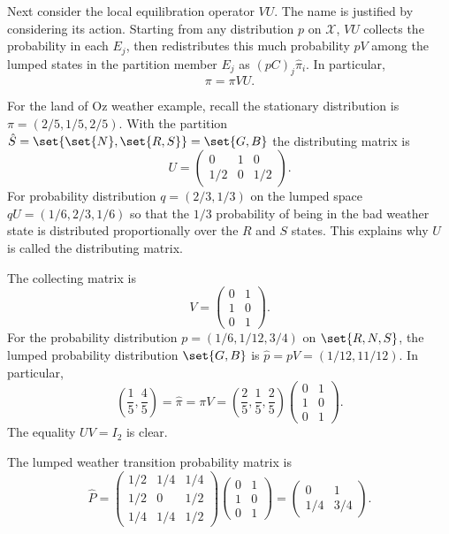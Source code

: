 \documentclass[12pt]{article}
\begin{document}
Next consider the local equilibration operator \( VU \).  The name is
justified by considering its action.  Starting from any distribution \(
p \) on \( \mathcal{X} \), \( VU \) collects the probability in each \(
E_j \), then redistributes this much probability \( pV \) among the
lumped states in the partition member \( E_j \) as \( (pC)_j
\hat{\pi}_i \).  In particular,
\[
    \pi = \pi VU.
\]

\begin{example}
    For the land of Oz weather example, recall the stationary
    distribution is \( \pi = (2/5, 1/5, 2/5) \).  With the partition
    \( \hat{S} = \set{ \set{N}, \set{R,S}} =\set{G, B} \)
    the distributing matrix is
    \[
        U =
        \begin{pmatrix}
            0 & 1 & 0 \\
            1/2 & 0 & 1/2
        \end{pmatrix}
        .
    \] For probability distribution \( q = (2/3, 1/3) \) on the lumped
    space \( qU = (1/6, 2/3, 1/6) \) so that the \( 1/3 \) probability
    of being in the bad weather state is distributed proportionally over
    the \( R \) and \( S \) states.  This explains why \( U \) is called
    the distributing matrix.

    The collecting matrix is
    \[
      V=\begin{pmatrix}
            0 & 1 \\
            1 & 0 \\
            0 & 1
        \end{pmatrix}
        .
      \]
    For the probability distribution \( p = (1/6, 1/12, 3/4) \) on \(
    \set{R,N,S} \), the lumped probability distribution \( \set{G, B}
    \) is \( \hat{p} = pV = (1/12, 11/12) \).  In particular,
    \[
      \left( \frac{1}{5}, \frac{4}{5} \right) = \hat{\pi} = \pi V =
      \left( \frac{2}{5}, \frac{1}{5}, \frac{2}{5} \right)
      \begin{pmatrix}
            0 & 1 \\
            1 & 0 \\
            0 & 1
        \end{pmatrix}
        . 
    \]
    The equality \( UV = I_2 \) is clear.
    
    The lumped weather transition probability matrix is
    \[
        \hat{P} =
        \begin{pmatrix}
            1/2 & 1/4 & 1/4 \\
            1/2 & 0 & 1/2 \\
            1/4 & 1/4 & 1/2
        \end{pmatrix}
        \begin{pmatrix}
            0 & 1 \\
            1 & 0 \\
            0 & 1
        \end{pmatrix}
        =
        \begin{pmatrix}
            0 & 1 \\
            1/4 & 3/4
        \end{pmatrix}
        .
      \]


\end{example}
\end{document}
